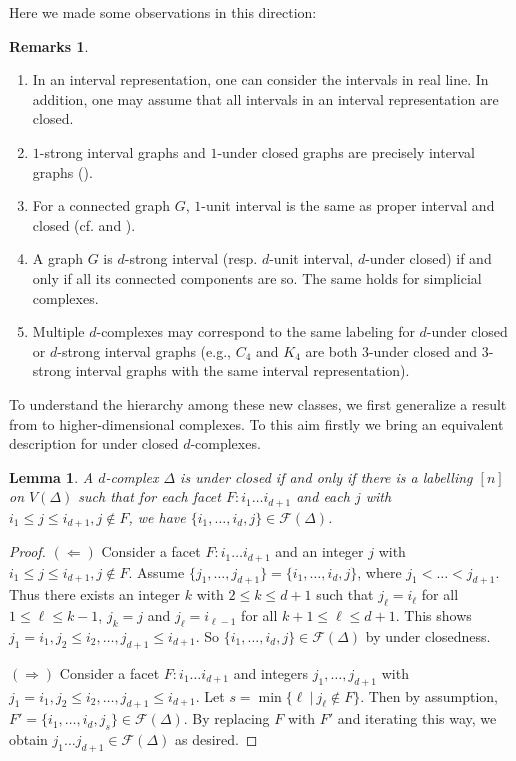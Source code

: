 \documentclass[12pt,reqno]{amsart}
\theoremstyle{plain}
\newtheorem{lemma}[theorem]{Lemma}
\theoremstyle{definition}
\newtheorem{remarks}[theorem]{Remarks}
\numberwithin{equation}{section}
\begin{document}
Here we made some observations in this direction:
\begin{remarks}\label{remarks1.2}
\begin{enumerate}
\item In an interval representation, one can consider the intervals in real line. In addition, one may assume that all intervals in an interval representation are closed.

\item $1$-strong interval graphs and $1$-under closed graphs are precisely interval graphs (\cite[Theorem 4]{Ol}). 

\item For a connected graph $G$,  $1$-unit interval is the same as proper interval and closed  (cf. \cite[Proposition 1 and Theorem 1]{LO} and \cite[Corollary 2.5]{C+R}).

\item A graph $G$ is $d$-strong interval (resp. $d$-unit interval, $d$-under closed) if and only if all its connected components are so. The same holds for simplicial complexes.

\item Multiple $d$-complexes may correspond to the same labeling for $d$-under closed or $d$-strong interval graphs (e.g., $C_4$ and $K_4$ are both $3$-under closed and $3$-strong interval graphs with the same interval representation).
\end{enumerate}
\end{remarks}

To understand the hierarchy among these new classes, we first generalize a result from \cite[Theorem 4]{Ol} to higher-dimensional complexes. To this aim firstly we bring an equivalent description for under closed $d$-complexes.

\begin{lemma}\label{global}
A $d$-complex $\Delta$ is under closed if and only if there is a labelling $[n]$ on $V(\Delta)$ such that  for each facet $F: i_1\dots i_{d+1}$ and each $j$ with $i_1\leq j\leq i_{d+1}, j\notin F$, we have $\{i_1, \dots , i_d, j\}\in \mathcal{F}(\Delta)$.
\end{lemma}
\begin{proof}
$(\Longleftarrow )$ Consider a facet $F: i_1\dots i_{d+1}$ and an integer $j$ with $i_1\leq j\leq i_{d+1}, j\notin F$. Assume $\{j_1, \dots , j_{d+1}\}=\{i_1, \dots , i_d, j\}$, where $j_1< \dots < j_{d+1}$. Thus there exists an integer $k$ with $2\leq k \leq d+1$ such that $j_\ell =i_\ell$ for all $1\leq \ell \leq k-1$, $j_k=j$ and $j_\ell=i_{\ell -1}$ for all $k+1\leq \ell \leq d+1$. This shows $j_1=i_1, j_2\leq i_2, \dots , j_{d+1}\leq i_{d+1}$. So $\{i_1, \dots , i_d, j\}\in \mathcal{F}(\Delta)$ by under closedness.

$(\Longrightarrow )$ Consider a facet $F: i_1\dots i_{d+1}$ and integers $j_1, \dots , j_{d+1}$ with $j_1=i_1, j_2\leq i_2, \dots , j_{d+1}\leq i_{d+1}$. Let $s=\min \{\ell \ | \ j_\ell \notin F\}$. Then by assumption, $F'=\{i_1, \dots, i_d, j_s\}\in \mathcal{F}(\Delta )$. By replacing $F$ with $F'$  and iterating this way, we obtain $j_1 \dots j_{d+1}\in \mathcal{F}(\Delta )$ as desired.
\end{proof}
\end{document}
